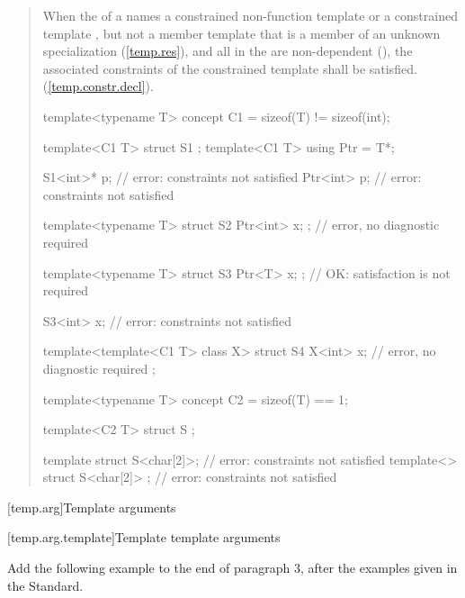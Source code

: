 \begin{quote}
\begin{addedblock}
\setcounter{Paras}{7}
\pnum
When the  of a  names
a constrained non-function template or a constrained template 
, but not a member template that is a member 
of an unknown specialization (\ref{temp.res}), and all 
 in the  
are non-dependent (), the associated constraints of the 
constrained template shall be satisfied. (\ref{temp.constr.decl}).
% 
\enterexample
\begin{codeblock}
template<typename T> concept C1 = sizeof(T) != sizeof(int);

template<C1 T> struct S1 { };
template<C1 T> using Ptr = T*;

S1<int>* p; // error: constraints not satisfied
Ptr<int> p; // error: constraints not satisfied

template<typename T>
  struct S2 { Ptr<int> x; }; // error, no diagnostic required

template<typename T>
  struct S3 { Ptr<T> x; };   // OK: satisfaction is not required

S3<int> x;                   // error: constraints not satisfied

template<template<C1 T> class X>
  struct S4 {
    X<int> x; // error, no diagnostic required
  };

template<typename T> concept C2 = sizeof(T) == 1;

template<C2 T> struct S { };

template struct S<char[2]>;       // error: constraints not satisfied
template<> struct S<char[2]> { }; // error: constraints not satisfied
\end{codeblock}
\end{addedblock}
\end{quote}

[temp.arg]{Template arguments}

\setcounter{subsection}{2}
[temp.arg.template]{Template template arguments}


Add the following example to the end of paragraph 3, after the
examples given in the \Cpp Standard.

